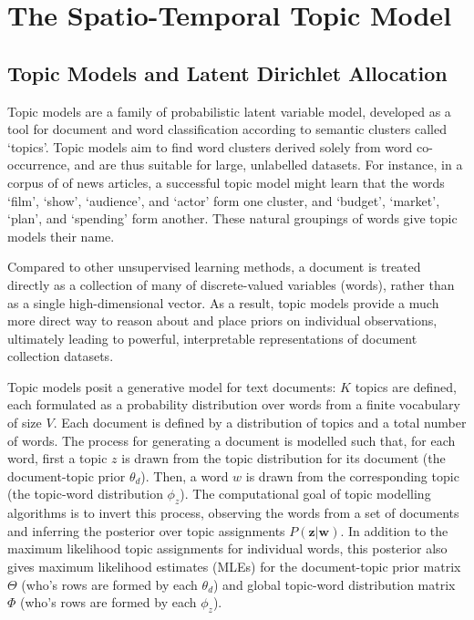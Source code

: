 
\chapter{The Spatio-Temporal Topic Model} \label{ch:topic-models-detail}
\section{Topic Models and Latent Dirichlet Allocation} \label{sec:topic-models-topic-models}
Topic models are a family of probabilistic latent variable model, developed as a tool for document and word classification according to semantic clusters called `topics'. Topic models aim to find word clusters derived solely from word co-occurrence, and are thus suitable for large, unlabelled datasets. For instance, in a corpus of of news articles, a successful topic model might learn that the words `film', `show', `audience', and `actor' form one cluster, and `budget', `market', `plan', and `spending' form another. These natural groupings of words give topic models their name.

Compared to other unsupervised learning methods, a document is treated directly as a collection of many of discrete-valued variables (words), rather than as a single high-dimensional vector. As a result, topic models provide a much more direct way to reason about and place priors on individual observations, ultimately leading to powerful, interpretable representations of document collection datasets.

Topic models posit a generative model for text documents: $K$ topics are defined, each formulated as a probability distribution over words from a finite vocabulary of size $V$. Each document is defined by a distribution of topics and a total number of words. The process for generating a document is modelled such that, for each word, first a topic $z$ is drawn from the topic distribution for its document (the document-topic prior $\theta_d$). Then, a word $w$ is drawn from the corresponding topic (the topic-word distribution $\phi_z$). The computational goal of topic modelling algorithms is to invert this process, observing the words from a set of documents and inferring the posterior over topic assignments $P(\boldsymbol{z} | \boldsymbol{w})$. In addition to the maximum likelihood topic assignments for individual words, this posterior also gives maximum likelihood estimates (MLEs) for the document-topic prior matrix $\Theta$ (who's rows are formed by each $\theta_d$) and global topic-word distribution matrix $\Phi$ (who's rows are formed by each $\phi_z$).

